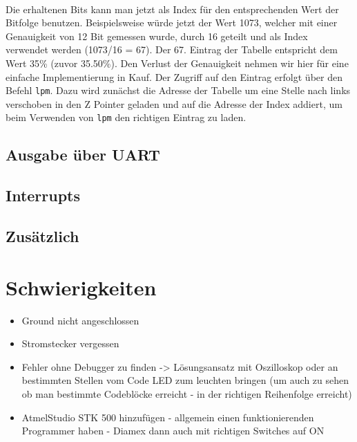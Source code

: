 \documentclass[]{article}
\begin{document}
\\
Die erhaltenen Bits kann man jetzt als Index für den entsprechenden Wert der Bitfolge benutzen. Beispielsweise würde jetzt der Wert 1073, welcher mit einer Genauigkeit von 12 Bit gemessen wurde, durch 16 geteilt und als Index verwendet werden (1073/16 = 67). Der 67. Eintrag der Tabelle entspricht dem Wert 35\% (zuvor 35.50\%). Den Verlust der Genauigkeit nehmen wir hier für eine einfache Implementierung in Kauf. Der Zugriff auf den Eintrag erfolgt über den Befehl \texttt{lpm}. Dazu wird zunächst die Adresse der Tabelle um eine Stelle nach links verschoben in den Z Pointer geladen und auf die Adresse der Index addiert, um beim Verwenden von \texttt{lpm} den richtigen Eintrag zu laden.

\subsection{Ausgabe über UART}

\subsection{Interrupts}

\subsection{Zusätzlich}

\section{Schwierigkeiten}
\begin{itemize}
	\item Ground nicht angeschlossen
	\item Stromstecker vergessen
	\item Fehler ohne Debugger zu finden -> Lösungsansatz mit Oszilloskop oder an bestimmten Stellen vom Code LED zum leuchten bringen (um auch zu sehen ob man bestimmte Codeblöcke erreicht - in der richtigen Reihenfolge erreicht)
	\item AtmelStudio STK 500 hinzufügen - allgemein einen funktionierenden Programmer haben - Diamex dann auch mit richtigen Switches auf ON 
\end{itemize}
\end{document}
